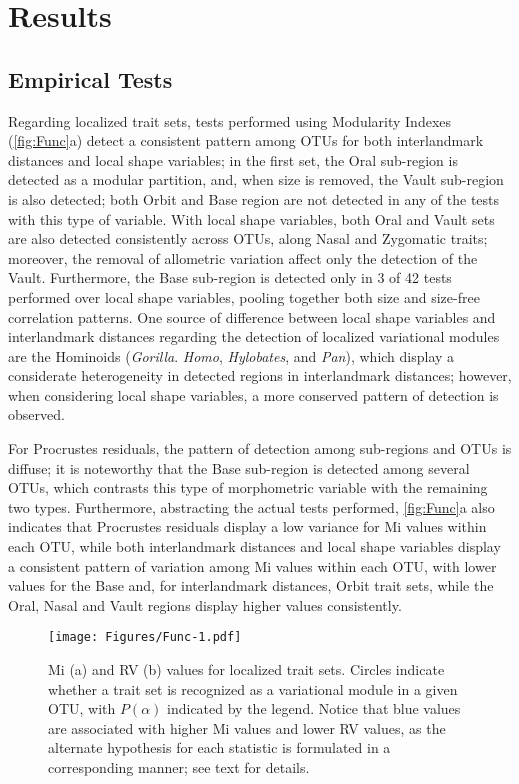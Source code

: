 \documentclass[12pt,]{article}
\begin{document}
\section{Results}\label{results}

\subsection{Empirical Tests}\label{empirical-tests}

Regarding localized trait sets, tests performed using Modularity Indexes
(\autoref{fig:Func}a) detect a consistent pattern among OTUs for both
interlandmark distances and local shape variables; in the first set, the
Oral sub-region is detected as a modular partition, and, when size is
removed, the Vault sub-region is also detected; both Orbit and Base
region are not detected in any of the tests with this type of variable.
With local shape variables, both Oral and Vault sets are also detected
consistently across OTUs, along Nasal and Zygomatic traits; moreover,
the removal of allometric variation affect only the detection of the
Vault. Furthermore, the Base sub-region is detected only in 3 of 42
tests performed over local shape variables, pooling together both size
and size-free correlation patterns. One source of difference between
local shape variables and interlandmark distances regarding the
detection of localized variational modules are the Hominoids
(\emph{Gorilla}. \emph{Homo}, \emph{Hylobates}, and \emph{Pan}), which
display a considerate heterogeneity in detected regions in interlandmark
distances; however, when considering local shape variables, a more
conserved pattern of detection is observed.

For Procrustes residuals, the pattern of detection among sub-regions and
OTUs is diffuse; it is noteworthy that the Base sub-region is detected
among several OTUs, which contrasts this type of morphometric variable
with the remaining two types. Furthermore, abstracting the actual tests
performed, \autoref{fig:Func}a also indicates that Procrustes residuals
display a low variance for Mi values within each OTU, while both
interlandmark distances and local shape variables display a consistent
pattern of variation among Mi values within each OTU, with lower values
for the Base and, for interlandmark distances, Orbit trait sets, while
the Oral, Nasal and Vault regions display higher values consistently.

\begin{figure}[htbp]
\centering
\texttt{[image: Figures/Func-1.pdf]}
\caption{Mi (a) and RV (b) values for localized trait sets. Circles
indicate whether a trait set is recognized as a variational module in a
given OTU, with $P(\alpha)$ indicated by the legend. Notice that blue
values are associated with higher Mi values and lower RV values, as the
alternate hypothesis for each statistic is formulated in a corresponding
manner; see text for details. \label{fig:Func}}
\end{figure}
\end{document}
